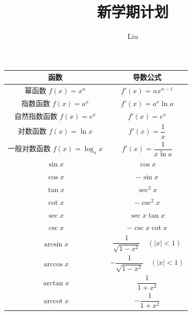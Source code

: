 \documentclass[UTF8]{ctexart}
\title{新学期计划}
\author{Liu}
\date{}
\newcommand{\arccot}{\operatorname{arccot}}
\begin{document}
\maketitle

\begin{center}
    \begin{tabular}{|c|c|}
        \hline
        \textbf{函数}                & \textbf{导数公式}                              \\
        \hline
        幂函数 \(f(x) = x^n\)         & \(f'(x) = n x^{n-1}\)                      \\
        \hline
        指数函数 \(f(x) = a^x\)        & \(f'(x) = a^x \ln a\)                      \\
        \hline
        自然指数函数 \(f(x) = e^x\)      & \(f'(x) = e^x\)                            \\
        \hline
        对数函数 \(f(x) = \ln x\)      & \(f'(x) = \dfrac{1}{x}\)                   \\
        \hline
        一般对数函数 \(f(x) = \log_a x\) & \(f'(x) = \dfrac{1}{x \ln a}\)             \\
        \hline
        \(\sin x\)                 & \(\cos x\)                                 \\
        \hline
        \(\cos x\)                 & \(-\sin x\)                                \\
        \hline
        \(\tan x\)                 & \(\sec^2 x\)                               \\
        \hline
        \(\cot x\)                 & \(-\csc^2 x\)                              \\
        \hline
        \(\sec x\)                 & \(\sec x \tan x\)                          \\
        \hline
        \(\csc x\)                 & \(-\csc x \cot x\)                         \\
        \hline
        \(\arcsin x\)              & \(\dfrac{1}{\sqrt{1-x^2}} \quad (|x|<1)\)  \\
        \hline
        \(\arccos x\)              & \(-\dfrac{1}{\sqrt{1-x^2}} \quad (|x|<1)\) \\
        \hline
        \(\arctan x\)              & \(\dfrac{1}{1+x^2}\)                       \\
        \hline
        \(\arccot x\)              & \(-\dfrac{1}{1+x^2}\)                      \\
        \hline
    \end{tabular}
\end{center}
\end{document}
